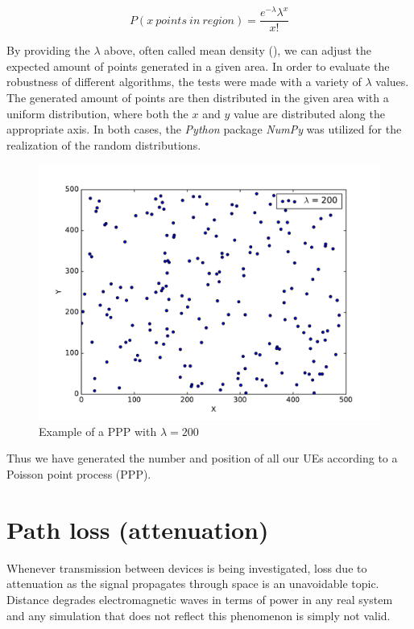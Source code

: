 \begin{equation} \label{eq:Poisson}
P\left( x\ points\ in\ region \right) = \frac{{e^{ - \lambda } \lambda ^x }}{{x!}}
\end{equation}

By providing the $\lambda$ above, often called mean density (\cite{Keeler2016}), we can adjust the expected amount of points generated in a given area. In order to evaluate the robustness of different algorithms, the tests were made with a variety of $\lambda$ values. The generated amount of points are then distributed in the given area with a uniform distribution, where both the $x$ and $y$ value are distributed along the appropriate axis. In both cases, the \textit{Python} package \textit{NumPy} was utilized for the realization of the random distributions.

\begin{figure}[!h]
\centering
\includegraphics[scale = 0.6]{figures/PPP}
\caption{Example of a PPP with $\lambda = 200$}
\end{figure}

Thus we have generated the number and position of all our UEs according to a Poisson point process (PPP).

\section{Path loss (attenuation)} \label{PL}
Whenever transmission between devices is being investigated, loss due to attenuation as the signal propagates through space is an unavoidable topic. Distance degrades electromagnetic waves in terms of power in any real system and any simulation that does not reflect this phenomenon is simply not valid. 

